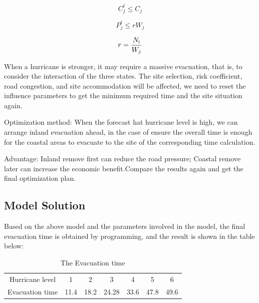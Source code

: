 \documentclass{mcmthesis}
\begin{document}
\begin{equation}\label{13}
C_j^t \le {C_j}
\end{equation}

\begin{equation}\label{14}
P_j^t \le r{W_j}
\end{equation}

\begin{equation}\label{15}
r = \frac{{{N_{\rm{i}}}}}{{{W_j}}}
\end{equation}

When a hurricane is stronger, it may require a massive evacuation, that is, to consider the interaction of the three states. The site selection, risk coefficient, road congestion, and site accommodation will be affected, we need to reset the influence parameters to get the minimum required time and the site situation again.

Optimization method: When the forecast hat hurricane level is high, we can arrange inland evacuation ahead, in the case of ensure the overall time is enough for the coastal areas to evacuate to the site of the corresponding time calculation.

Advantage: Inland remove first can reduce the road pressure; Coastal remove later can increase the economic benefit.Compare the results again and get the final optimization plan.

\subsection{Model Solution}
Based on the above model and the parameters involved in the model, the final evacuation time is obtained by programming, and the result is shown in the table below:
\begin{table}[!htb]
\centering
\setlength{\abovecaptionskip}{0pt}%
\setlength{\belowcaptionskip}{10pt}%
\caption{The Evacuation time}
\begin{tabular}{ccccccc}
\toprule[1.5pt]
Hurricane level &1&2&3&4&5&6\\
Evacuation time &11.4&18.2&24.28&33.6&47.8&49.6\\
\bottomrule[1.5pt]
\end{tabular}
\end{table}
\end{document}

